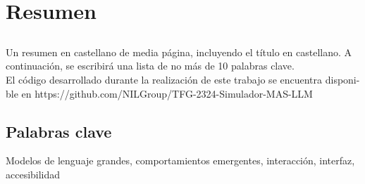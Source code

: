 \chapter*{Resumen}

\section*{\tituloPortadaVal}

Un resumen en castellano de media página, incluyendo el título en castellano. A continuación, se escribirá una lista de no más de 10 palabras clave.\\[0.1em]

El código desarrollado durante la realización de este trabajo se encuentra disponi- ble en https://github.com/NILGroup/TFG-2324-Simulador-MAS-LLM


\section*{Palabras clave}
   
\noindent Modelos de lenguaje grandes, comportamientos emergentes, interacción, interfaz, accesibilidad

   


